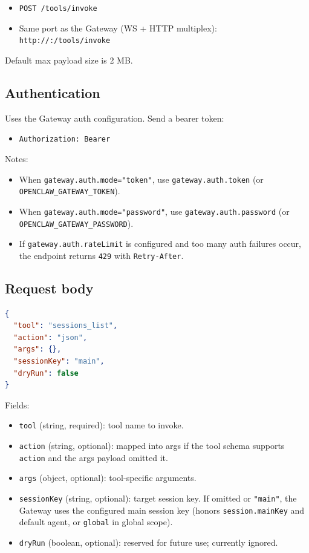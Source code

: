 \begin{itemize}
  \item \texttt{POST /tools/invoke}
  \item Same port as the Gateway (WS + HTTP multiplex): \texttt{http://:/tools/invoke}
\end{itemize}


Default max payload size is 2 MB.

\subsection{Authentication}


Uses the Gateway auth configuration. Send a bearer token:

\begin{itemize}
  \item \texttt{Authorization: Bearer }
\end{itemize}


Notes:

\begin{itemize}
  \item When \texttt{gateway.auth.mode="token"}, use \texttt{gateway.auth.token} (or \texttt{OPENCLAW\_GATEWAY\_TOKEN}).
  \item When \texttt{gateway.auth.mode="password"}, use \texttt{gateway.auth.password} (or \texttt{OPENCLAW\_GATEWAY\_PASSWORD}).
  \item If \texttt{gateway.auth.rateLimit} is configured and too many auth failures occur, the endpoint returns \texttt{429} with \texttt{Retry-After}.
\end{itemize}


\subsection{Request body}


\begin{lstlisting}[language=json]
{
  "tool": "sessions_list",
  "action": "json",
  "args": {},
  "sessionKey": "main",
  "dryRun": false
}
\end{lstlisting}


Fields:

\begin{itemize}
  \item \texttt{tool} (string, required): tool name to invoke.
  \item \texttt{action} (string, optional): mapped into args if the tool schema supports \texttt{action} and the args payload omitted it.
  \item \texttt{args} (object, optional): tool-specific arguments.
  \item \texttt{sessionKey} (string, optional): target session key. If omitted or \texttt{"main"}, the Gateway uses the configured main session key (honors \texttt{session.mainKey} and default agent, or \texttt{global} in global scope).
  \item \texttt{dryRun} (boolean, optional): reserved for future use; currently ignored.
\end{itemize}



